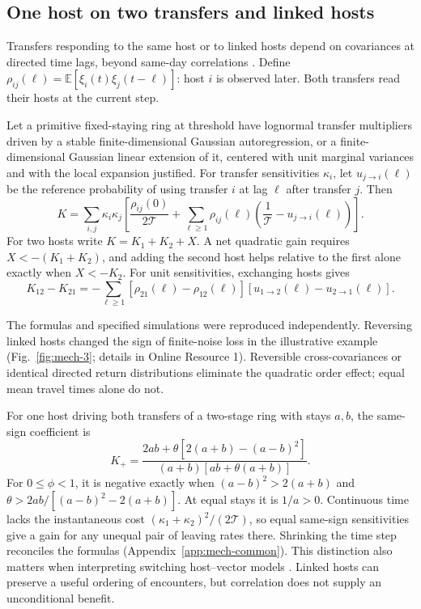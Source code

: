 \subsection{One host on two transfers and linked hosts}
Transfers responding to the same host or to linked hosts depend on covariances at directed time lags, beyond same-day correlations \citep{tuljapurkar1982a,tuljapurkar2006}. Define
\(\rho_{ij}(\ell)=\mathbb E[\xi_i(t)\xi_j(t-\ell)]\): host \(i\) is observed later. Both transfers read their hosts at the current step.

\begin{proposition}\label{prop:mech-linked}
Let a primitive fixed-staying ring at threshold have lognormal transfer multipliers driven by a stable finite-dimensional Gaussian autoregression, or a finite-dimensional Gaussian linear extension of it, centered with unit marginal variances and with the local expansion justified. For transfer sensitivities \(\kappa_i\), let \(u_{j\to i}(\ell)\) be the reference probability of using transfer \(i\) at lag \(\ell\) after transfer \(j\). Then
\begin{equation}\label{eq:mech-linked}
 K=\sum_{i,j}\kappa_i\kappa_j\left[\frac{\rho_{ij}(0)}{2\mathcal T}
 +\sum_{\ell\geq1}\rho_{ij}(\ell)\left(\frac1{\mathcal T}-u_{j\to i}(\ell)\right)\right].
\end{equation}
For two hosts write \(K=K_1+K_2+X\). A net quadratic gain requires \(X<-(K_1+K_2)\), and adding the second host helps relative to the first alone exactly when \(X<-K_2\). For unit sensitivities, exchanging hosts gives
\begin{equation}\label{eq:mech-order}
 K_{12}-K_{21}=-\sum_{\ell\geq1}[\rho_{21}(\ell)-\rho_{12}(\ell)]
 [u_{1\to2}(\ell)-u_{2\to1}(\ell)].
\end{equation}
\end{proposition}
The formulas and specified simulations were reproduced independently. Reversing linked hosts changed the sign of finite-noise loss in the illustrative example (Fig.~\ref{fig:mech-3}; details in Online Resource 1). Reversible cross-covariances or identical directed return distributions eliminate the quadratic order effect; equal mean travel times alone do not.

For one host driving both transfers of a two-stage ring with stays \(a,b\), the same-sign coefficient is
\begin{equation}\label{eq:mech-common}
 K_+=\frac{2ab+\theta[2(a+b)-(a-b)^2]}{(a+b)[ab+\theta(a+b)]}.
\end{equation}
For \(0\leq\phi<1\), it is negative exactly when \((a-b)^2>2(a+b)\) and \(\theta>2ab/[(a-b)^2-2(a+b)]\). At equal stays it is \(1/a>0\). Continuous time lacks the instantaneous cost \((\kappa_1+\kappa_2)^2/(2\mathcal T)\), so equal same-sign sensitivities give a gain for any unequal pair of leaving rates there. Shrinking the time step reconciles the formulas (Appendix~\ref{app:mech-common}). This distinction also matters when interpreting switching host--vector models \citep{watts2021}. Linked hosts can preserve a useful ordering of encounters, but correlation does not supply an unconditional benefit.

